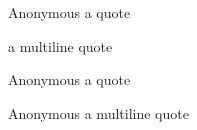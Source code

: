 \begin{Quotation}{Anonymous}
a quote

a
multiline
quote
\end{Quotation}

\horizontalLine

\begin{Quotation}{Anonymous}
a quote
\end{Quotation}

\horizontalLine

\begin{Quotation}{Anonymous}
a
multiline
quote
\end{Quotation}

